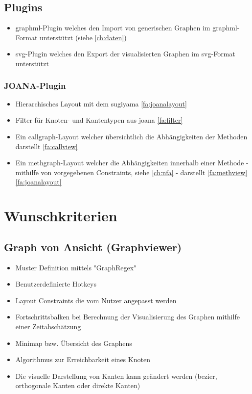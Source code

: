 \subsection{Plugins}
  \begin{itemize}
    \item \gls{graphml}-Plugin welches den Import von generischen Graphen im \gls{graphml}-Format unterstützt (siehe \ref{ch:daten})
    \item \gls{svg}-Plugin welches den Export der visualisierten Graphen im \gls{svg}-Format unterstützt
  \end{itemize}
  
  \subsubsection{JOANA-Plugin}
    \begin{itemize}
      \item Hierarchisches Layout mit dem \gls{sugiyama} \ref{fa:joanalayout}
      \item Filter für Knoten- und Kantentypen aus \gls{joana} \ref{fa:filter}
      \item Ein \gls{callgraph}-Layout welcher übersichtlich die Abhängigkeiten der Methoden darstellt \ref{fa:callview}
      \item Ein \gls{methgraph}-Layout welcher die Abhängigkeiten innerhalb einer Methode - mithilfe von vorgegebenen Constraints, siehe \ref{ch:nfa} - darstellt \ref{fa:methview} \ref{fa:joanalayout}
    \end{itemize}
  

\section{Wunschkriterien}

\subsection{Graph von Ansicht (Graphviewer)}
  \begin{itemize}
    \item Muster Definition mittels "GraphRegex"
    \item Benutzerdefinierte Hotkeys
    \item Layout Constraints die vom Nutzer angepasst werden
    \item Fortschrittsbalken bei Berechnung der Visualisierung des Graphen mithilfe einer Zeitabschätzung
    \item Minimap bzw. Übersicht des Graphens
    \item Algorithmus zur Erreichbarkeit eines Knoten
    \item Die visuelle Darstellung von Kanten kann geändert werden (\gls{bezier}, orthogonale Kanten oder direkte Kanten)
  \end{itemize}

